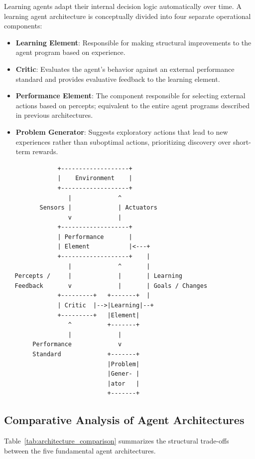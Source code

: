 \documentclass[12pt]{report}
\begin{document}
Learning agents adapt their internal decision logic automatically over time. A learning agent architecture is conceptually divided into four separate operational components:
\begin{itemize}
    \item \textbf{Learning Element}: Responsible for making structural improvements to the agent program based on experience.
    \item \textbf{Critic}: Evaluates the agent's behavior against an external performance standard and provides evaluative feedback to the learning element.
    \item \textbf{Performance Element}: The component responsible for selecting external actions based on percepts; equivalent to the entire agent programs described in previous architectures.
    \item \textbf{Problem Generator}: Suggests exploratory actions that lead to new experiences rather than suboptimal actions, prioritizing discovery over short-term rewards.
\end{itemize}

\begin{verbatim}
               +-------------------+
               |    Environment    |
               +-------------------+
                  |             ^
          Sensors |             | Actuators
                  v             |
               +-------------------+
               | Performance       |
               | Element           |<---+
               +-------------------+    |
                  |             ^       |
   Percepts /     |             |       | Learning
   Feedback       v             |       | Goals / Changes
               +---------+   +-------+  |
               | Critic  |-->|Learning|--+
               +---------+   |Element|
                  ^          +-------+
                  |             |
        Performance             v
        Standard             +-------+
                             |Problem|
                             |Gener- |
                             |ator   |
                             +-------+
\end{verbatim}

\subsection{Comparative Analysis of Agent Architectures}

Table~\ref{tab:architecture_comparison} summarizes the structural trade-offs between the five fundamental agent architectures.
\end{document}
